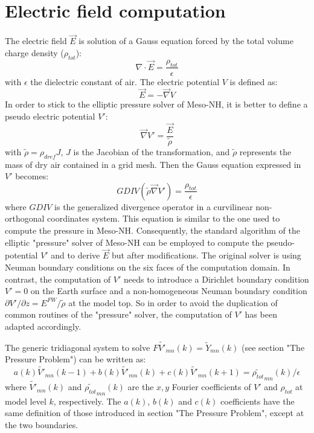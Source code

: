 \section{Electric field computation}

The electric field $\overrightarrow{E}$ is solution of a Gauss equation forced by the total volume charge density ($\rho _{tot}$):
\begin{equation}
  \nabla \cdot \overrightarrow{E} = \frac{\rho _{tot}}{\epsilon}
\end{equation}
with $\epsilon$ the dielectric constant of air.
The electric potential $V$ is defined as:
\begin{equation}
  \overrightarrow{E} = - \overrightarrow{\nabla} V
\end{equation}
In order to stick to the elliptic pressure solver of Meso-NH, it is better to define a pseudo electric potential $V'$:
\begin{equation}
  \overrightarrow{\nabla} V' = \frac{\overrightarrow{E}}{\tilde{\rho}}
\end{equation}
with $\tilde{\rho} = \rho _{dref} J$, $J$ is the Jacobian of the transformation, and $\tilde{\rho}$ represents the mass of dry air contained in a grid mesh.
Then the Gauss equation expressed in $V'$ becomes:
\begin{equation}
  GDIV(\tilde{\rho} \overrightarrow{\nabla} V') = \frac{\rho _{tot}}{\epsilon}
\end{equation}
where $GDIV$ is the generalized divergence operator in a curvilinear non-orthogonal coordinates system. This equation is similar to the one used to compute the pressure in Meso-NH. Consequently, the standard algorithm of the elliptic "pressure" solver of Meso-NH can be employed to compute the pseudo-potential $V'$ and to derive $\overrightarrow{E}$ but after modifications. The original solver is using Neuman boundary conditions on the six faces of the computation domain. In contrast, the computation of $V'$ needs to introduce a Dirichlet boundary condition $V'=0$ on the Earth surface and a non-homogeneous Neuman boundary condition $\partial{V'}/\partial z=E^{FW}/\tilde{\rho}$ at the model top. So in order to avoid the duplication of common routines of the "pressure" solver, the computation of $V'$ has been adapted accordingly. 

The generic tridiagonal system to solve $F\tilde{V'}_{mn}(k)=\tilde{Y}_{mn}(k)$ (see section "The Pressure Problem") can be written as:
\begin{displaymath}
a(k) \tilde{V'}_{m n}(k-1) + b(k) \tilde{V'}_{m n}(k) + c(k) \tilde{V'}_{m n}(k+1)=\tilde{\rho_{tot}}_{m n}(k)/\epsilon
\end{displaymath}  
where $\tilde{V'}_{m n}(k)$ and $\tilde{\rho _{tot}}_{m n}(k)$ are the $x,y$ Fourier coefficients of $V'$ and $\rho _{tot}$ at model level $k$, respectively. The $a(k)$, $b(k)$ and $c(k)$ coefficients have the same definition of those introduced in section "The Pressure Problem", except at the two boundaries. 

